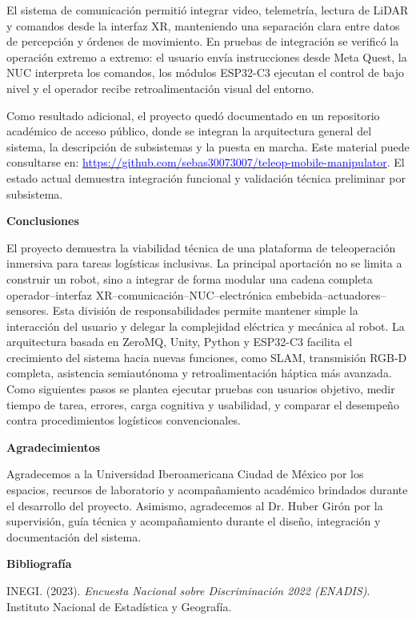 \documentclass[12pt,letterpaper]{article}
\begin{document}
El sistema de comunicación permitió integrar video, telemetría, lectura de LiDAR y comandos desde la interfaz XR, manteniendo una separación clara entre datos de percepción y órdenes de movimiento. En pruebas de integración se verificó la operación extremo a extremo: el usuario envía instrucciones desde Meta Quest, la NUC interpreta los comandos, los módulos ESP32-C3 ejecutan el control de bajo nivel y el operador recibe retroalimentación visual del entorno.

Como resultado adicional, el proyecto quedó documentado en un repositorio académico de acceso público, donde se integran la arquitectura general del sistema, la descripción de subsistemas y la puesta en marcha. Este material puede consultarse en: \href{https://github.com/sebas30073007/teleop-mobile-manipulator}{\textcolor{blue}{https://github.com/sebas30073007/teleop-mobile-manipulator}}. El estado actual demuestra integración funcional y validación técnica preliminar por subsistema.

\textbf{Conclusiones}

El proyecto demuestra la viabilidad técnica de una plataforma de teleoperación inmersiva para tareas logísticas inclusivas. La principal aportación no se limita a construir un robot, sino a integrar de forma modular una cadena completa operador--interfaz XR--comunicación--NUC--electrónica embebida--actuadores--sensores. Esta división de responsabilidades permite mantener simple la interacción del usuario y delegar la complejidad eléctrica y mecánica al robot. La arquitectura basada en ZeroMQ, Unity, Python y ESP32-C3 facilita el crecimiento del sistema hacia nuevas funciones, como SLAM, transmisión RGB-D completa, asistencia semiautónoma y retroalimentación háptica más avanzada. Como siguientes pasos se plantea ejecutar pruebas con usuarios objetivo, medir tiempo de tarea, errores, carga cognitiva y usabilidad, y comparar el desempeño contra procedimientos logísticos convencionales.

\textbf{Agradecimientos}

Agradecemos a la Universidad Iberoamericana Ciudad de México por los espacios, recursos de laboratorio y acompañamiento académico brindados durante el desarrollo del proyecto. Asimismo, agradecemos al Dr. Huber Girón por la supervisión, guía técnica y acompañamiento durante el diseño, integración y documentación del sistema.

\textbf{Bibliografía}

INEGI. (2023). \textit{Encuesta Nacional sobre Discriminación 2022 (ENADIS)}. Instituto Nacional de Estadística y Geografía.
\end{document}
